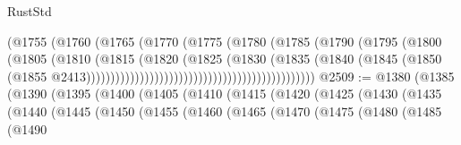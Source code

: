 \begin{lexlean}{RustStd}
\begin{coremodule}
                                                        (@1755
                                                          (@1760
                                                            (@1765
                                                              (@1770
                                                                (@1775
                                                                  (@1780
                                                                    (@1785
                                                                      (@1790
                                                                        (@1795
                                                                          (@1800
                                                                            (@1805
                                                                              (@1810
                                                                                (@1815
                                                                                  (@1820
                                                                                    (@1825
                                                                                      (@1830
                                                                                        (@1835
                                                                                          (@1840
                                                                                            (@1845
                                                                                              (@1850
                                                                                                (@1855
                                                                                                  @2413)))))))))))))))))))))))))))))))))))))))))))))))
@2509 := @1380
    (@1385
      (@1390
        (@1395
          (@1400
            (@1405
              (@1410
                (@1415
                  (@1420
                    (@1425
                      (@1430
                        (@1435
                          (@1440
                            (@1445
                              (@1450
                                (@1455
                                  (@1460
                                    (@1465
                                      (@1470
                                        (@1475
                                          (@1480
                                            (@1485
                                              (@1490

\end{coremodule}
\end{lexlean}
